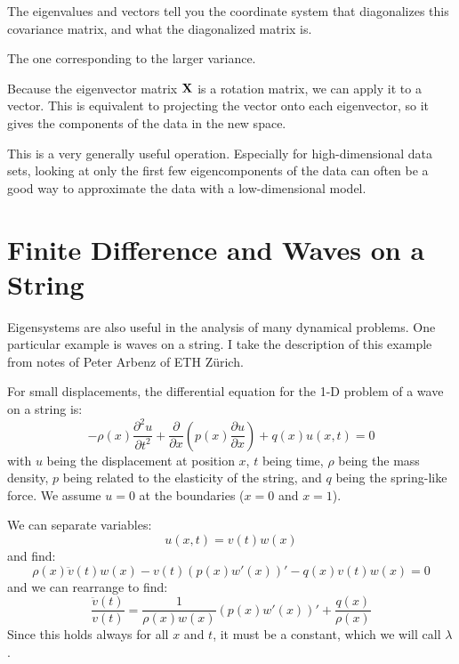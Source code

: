 
The eigenvalues and vectors tell you the coordinate system that
diagonalizes this covariance matrix, and what the diagonalized matrix
is.


\begin{answer}
The one corresponding to the larger variance.
\end{answer}

Because the eigenvector matrix ${\bf X}$ is a rotation matrix, we can
apply it to a vector.  This is equivalent to projecting the vector
onto each eigenvector, so it gives the components of the data in the
new space.

This is a very generally useful operation. Especially for
high-dimensional data sets, looking at only the first few
eigencomponents of the data can often be a good way to approximate the
data with a low-dimensional model.

\section{Finite Difference and Waves on a String}

Eigensystems are also useful in the analysis of many dynamical
problems. One particular example is waves on a string. I take the
description of this example from notes of Peter Arbenz of ETH
Z\"urich.

For small displacements, the differential equation for the 1-D problem
of a wave on a string is:
\begin{equation}
- \rho(x) \frac{\partial^2 u}{\partial t^2}
+ \frac{\partial }{\partial x}\left(p(x) \frac{\partial u}{\partial
  x}\right)
+ q(x) u(x, t) = 0
\end{equation}
with $u$ being the displacement at position $x$, $t$ being time,
$\rho$ being the mass density, $p$ being related to the elasticity of
the string, and $q$ being the spring-like force. We assume $u=0$ at
the boundaries ($x=0$ and $x=1$).

We can separate variables:
\begin{equation}
u(x, t) = v(t) w(x)
\end{equation}
and find:
\begin{equation}
\rho(x) \ddot{v}(t) w(x) - v(t) \left(p(x) w'(x)\right)' - q(x)v(t) w(x) = 0
\end{equation}
and we can rearrange to find:
\begin{equation}
\frac{\ddot{v}(t)}{v(t)} = \frac{1}{\rho(x) w(x)}\left(p(x)
w'(x)\right)' + \frac{q(x)}{\rho(x)}
\end{equation}
Since this holds always for all $x$ and $t$, it must be a constant,
which we will call $\lambda$. 

